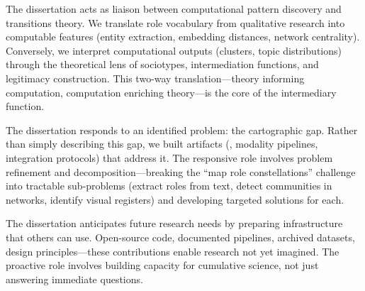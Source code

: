 \documentclass[../main.tex]{subfiles}
\begin{document}
\begin{center}
\end{center}

\begin{description}[leftmargin=0.5cm, itemsep=0.4em]
\item[Intermediary Role] The dissertation acts as liaison between computational pattern discovery and transitions theory. We translate role vocabulary from qualitative research into computable features (entity extraction, embedding distances, network centrality). Conversely, we interpret computational outputs (clusters, topic distributions) through the theoretical lens of sociotypes, intermediation functions, and legitimacy construction. This two-way translation---theory informing computation, computation enriching theory---is the core of the intermediary function.

\item[Responsive Role] The dissertation responds to an identified problem: the cartographic gap. Rather than simply describing this gap, we built artifacts (\RoleBox{}, modality pipelines, integration protocols) that address it. The responsive role involves problem refinement and decomposition---breaking the ``map role constellations'' challenge into tractable sub-problems (extract roles from text, detect communities in networks, identify visual registers) and developing targeted solutions for each.

\item[Proactive Role] The dissertation anticipates future research needs by preparing infrastructure that others can use. Open-source code, documented pipelines, archived datasets, design principles---these contributions enable research not yet imagined. The proactive role involves building capacity for cumulative science, not just answering immediate questions.
\end{description}
\end{document}
